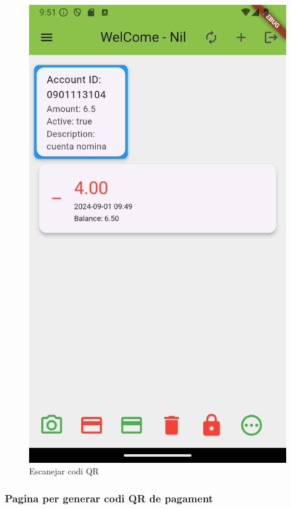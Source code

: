 \documentclass[a4paper,12pt,twoside]{ThesisStyle}
\begin{document}
\begin{figure}[h]
\begin{minipage}{0.31\textwidth}
        \includegraphics[width=\linewidth]{imatges/scanresult.png}
    \end{minipage}
    
    \caption{Escanejar codi QR}
    \label{fig:EscanejarCodiQR}
\end{figure}


\clearpage

\subsubsection{Pagina per generar codi QR de pagament}
\label{subsubsec:Pagina per generar codi QR de pagament}
\end{document}
